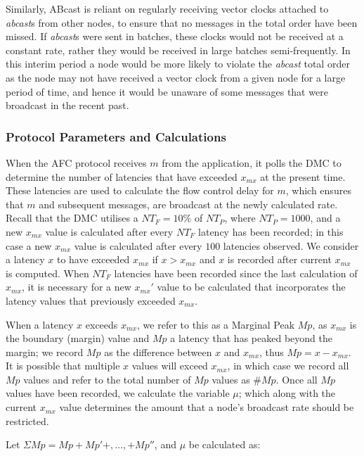     Similarly, \textsf{ABcast} is reliant on regularly receiving vector clocks attached to \emph{abcast}s from other nodes, to ensure that no messages in the total order have been missed.  If \emph{abcast}s were sent in batches, these clocks would not be received at a constant rate, rather they would be received in large batches semi-frequently.  In this interim period a node would be more likely to violate the \emph{abcast} total order as the node may not have received a vector clock from a given node for a large period of time, and hence it would be unaware of some messages that were broadcast in the recent past.  
   
   \subsubsection*{Protocol Parameters and Calculations}  
   When the AFC protocol receives $m$ from the application, it polls the DMC to determine the number of latencies that have exceeded $x_{mx}$ at the present time.  These latencies are used to calculate the flow control delay for $m$, which ensures that $m$ and subsequent messages, are broadcast at the newly calculated rate.  Recall that the DMC utilises a $NT_F = 10\%$ of $NT_P$, where $NT_P = 1000$, and a new $x_{mx}$ value is calculated after every $NT_F$ latency has been recorded; in this case a new $x_{mx}$ value is calculated after every $100$ latencies observed.    We consider a latency $x$ to have exceeded $x_{mx}$ if $x > x_{mx}$ and $x$ is recorded after current $x_{mx}$ is computed.  When $NT_F$ latencies have been recorded since the last calculation of $x_{mx}$, it is necessary for a new $x_{mx}'$ value to be calculated that incorporates the latency values that previously exceeded $x_{mx}$.  
       
    When a latency $x$ exceeds $x_{mx}$, we refer to this as a Marginal Peak $Mp$, as $x_{mx}$ is the boundary (margin) value and $Mp$ a latency that has peaked beyond the margin; we record $Mp$ as the difference between $x$ and $x_{mx}$, thus $Mp = x - x_{mx}$.  It is possible that multiple $x$ values will exceed $x_{mx}$, in which case we record all $Mp$ values and refer to the total number of $Mp$ values as $\#Mp$.   Once all $Mp$ values have been recorded, we calculate the variable $\mu$; which along with the current $x_{mx}$ value determines the amount that a node's broadcast rate should be restricted.  
    
    Let $\Sigma Mp = Mp + Mp'+,\ldots,+ Mp''$, and $\mu$ be calculated as:
    
